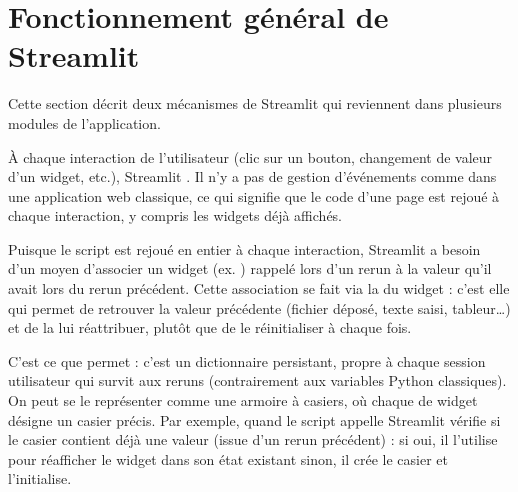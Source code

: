 \documentclass[letterpaper,10pt,english]{sphinxmanual}
\begin{document}
\section{Fonctionnement général de Streamlit}
\label{\detokenize{Home:fonctionnement-general-de-streamlit}}
\sphinxAtStartPar
Cette section décrit deux mécanismes de Streamlit qui reviennent dans
plusieurs modules de l’application.

\sphinxAtStartPar
{}

\sphinxAtStartPar
À chaque interaction de l’utilisateur (clic sur un bouton, changement de
valeur d’un widget, etc.), Streamlit . Il n’y a pas de gestion d’événements comme dans une
application web classique, ce qui signifie que le code d’une page est rejoué à chaque
interaction, y compris les widgets déjà affichés.

\sphinxAtStartPar
{}

\sphinxAtStartPar
Puisque le script est rejoué en entier à chaque interaction, Streamlit a
besoin d’un moyen d’associer un widget (ex. )
rappelé lors d’un rerun à la valeur qu’il avait lors du rerun précédent.
Cette association se fait via la  du widget : c’est elle qui permet
de retrouver la valeur précédente (fichier déposé, texte saisi, tableur…) et de la
lui réattribuer, plutôt que de le réinitialiser à chaque fois.

\sphinxAtStartPar
C’est ce que permet  : c’est un dictionnaire persistant,
propre à chaque session utilisateur qui survit aux reruns (contrairement
aux variables Python classiques). On peut se le représenter comme une armoire à casiers, où
chaque  de widget désigne un casier précis. Par exemple, quand le script appelle
 Streamlit vérifie si le casier
 contient déjà une valeur (issue d’un rerun précédent) :
si oui, il l’utilise pour réafficher le widget dans son état existant
sinon, il crée le casier et l’initialise.
\end{document}
